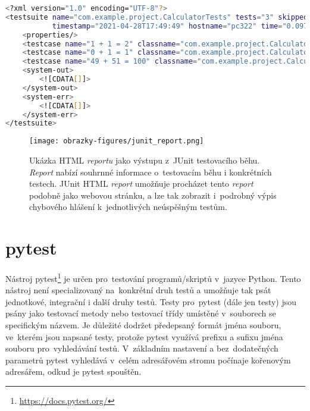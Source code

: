 \begin{lstlisting}[language=bash, basicstyle=\scriptsize\ttfamily, label={code:junit_xml_report}, caption=Příklad XML \textit{reportu}{,} který nabízí základní informace o~testovacím běhu a~informace o~výsledku testování.]
<?xml version="1.0" encoding="UTF-8"?>
<testsuite name="com.example.project.CalculatorTests" tests="3" skipped="0" failures="0" errors="0"
           timestamp="2021-04-28T17:49:49" hostname="pc322" time="0.097">
    <properties/>
    <testcase name="1 + 1 = 2" classname="com.example.project.CalculatorTests" time="0.029"/>
    <testcase name="0 + 1 = 1" classname="com.example.project.CalculatorTests" time="0.026"/>
    <testcase name="49 + 51 = 100" classname="com.example.project.CalculatorTests" time="0.002"/>
    <system-out>
        <![CDATA[]]>
    </system-out>
    <system-err>
        <![CDATA[]]>
    </system-err>
</testsuite>
\end{lstlisting}
\vspace{0.7em}

\begin{figure}[H]
	\centering
	\texttt{[image: obrazky-figures/junit\_report.png]}
	\caption{Ukázka HTML \textit{reportu} jako výstupu z~JUnit testovacího běhu. \textit{Report} nabízí souhrnné informace o~testovacím běhu i konkrétních testech. JUnit HTML \textit{report} umožňuje procházet tento \textit{report} podobně jako webovou stránku, a lze tak zobrazit i~podrobný výpis chybového hlášení k~jednotlivých neúspěšným testům.}
	\label{img:junit_html_report}
\end{figure}

\section{pytest}
\label{section:pytest}
Nástroj pytest\footnote{\href{https://docs.pytest.org/}{https://docs.pytest.org/}} je určen pro~testování
programů/skriptů v~jazyce Python. Tento nástroj není specializovaný na~konkrétní druh testů a umožňuje tak psát
jednotkové, integrační i další druhy testů. Testy pro~pytest (dále jen testy) jsou psány jako testovací metody nebo
testovací třídy umístěné v~souborech se specifickým názvem. Je důležité dodržet předepsaný formát jména souboru,
ve~kterém jsou napsané testy, protože pytest využívá prefixu a sufixu jména souboru pro~vyhledávání testů.
V~základním nastavení a bez~dodatečných parametrů pytest vyhledává v~celém adresářovém stromu počínaje kořenovým
adresářem, odkud je pytest spouštěn.

